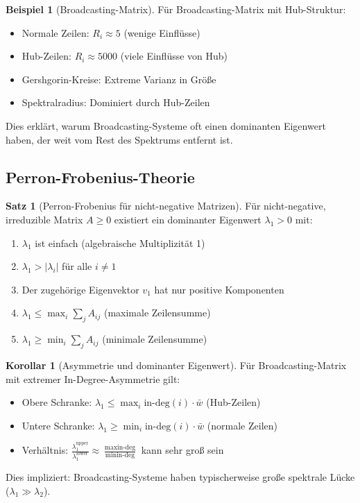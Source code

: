 \documentclass[a4paper,12pt]{report}
\theoremstyle{definition}
\newtheorem{beispiel}{Beispiel}
\newtheorem{satz}{Satz}
\newtheorem{korollar}{Korollar}
\begin{document}
	\begin{beispiel}[Broadcasting-Matrix]
		Für Broadcasting-Matrix mit Hub-Struktur:
		\begin{itemize}
			\item Normale Zeilen: $R_i \approx 5$ (wenige Einflüsse)
			\item Hub-Zeilen: $R_i \approx 5000$ (viele Einflüsse von Hub)
			\item Gershgorin-Kreise: Extreme Varianz in Größe
			\item Spektralradius: Dominiert durch Hub-Zeilen
		\end{itemize}
		
		Dies erklärt, warum Broadcasting-Systeme oft einen dominanten Eigenwert haben, der weit vom Rest des Spektrums entfernt ist.
	\end{beispiel}
	
	\subsection{Perron-Frobenius-Theorie}
	
	\begin{satz}[Perron-Frobenius für nicht-negative Matrizen]
		Für nicht-negative, irreduzible Matrix $A \geq 0$ existiert ein dominanter Eigenwert $\lambda_1 > 0$ mit:
		\begin{enumerate}
			\item $\lambda_1$ ist einfach (algebraische Multiplizität 1)
			\item $\lambda_1 > |\lambda_i|$ für alle $i \neq 1$
			\item Der zugehörige Eigenvektor $v_1$ hat nur positive Komponenten
			\item $\lambda_1 \leq \max_i \sum_j A_{ij}$ (maximale Zeilensumme)
			\item $\lambda_1 \geq \min_i \sum_j A_{ij}$ (minimale Zeilensumme)
		\end{enumerate}
	\end{satz}
	
	\begin{korollar}[Asymmetrie und dominanter Eigenwert]
		Für Broadcasting-Matrix mit extremer In-Degree-Asymmetrie gilt:
		\begin{itemize}
			\item Obere Schranke: $\lambda_1 \leq \max_i \text{in-deg}(i) \cdot \bar{w}$ (Hub-Zeilen)
			\item Untere Schranke: $\lambda_1 \geq \min_i \text{in-deg}(i) \cdot \bar{w}$ (normale Zeilen)
			\item Verhältnis: $\frac{\lambda_1^{\text{upper}}}{\lambda_1^{\text{lower}}} \approx \frac{\max \text{in-deg}}{\min \text{in-deg}}$ kann sehr groß sein
		\end{itemize}
		
		Dies impliziert: Broadcasting-Systeme haben typischerweise große spektrale Lücke ($\lambda_1 \gg \lambda_2$).
	\end{korollar}
	
\end{document}
